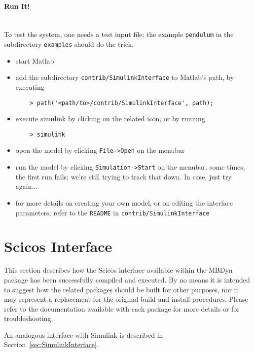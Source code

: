 \documentclass[10pt,dvips]{report}
\newcommand{\kw}[1]{\texttt{#1}}
\begin{document}
\paragraph{Run It!} \mbox{} \\
To test the system, one needs a test input file; the example
\kw{pendulum} in the subdirectory \kw{examples}
should do the trick.
\begin{itemize}
\item start Matlab
\item add the subdirectory \kw{contrib/SimulinkInterface} to Matlab's
path, by executing
\begin{verbatim}
    > path('<path/to>/contrib/SimulinkInterface', path);
\end{verbatim}
\item execute simulink by clicking on the related icon, or by running
\begin{verbatim}
    > simulink
\end{verbatim}
\item open the model by clicking \kw{File->Open} on the menubar
\item run the model by clicking \kw{Simulation->Start} on the menubar.
some times, the first run fails; we're still trying to track that down.
In case, just try again...
\item for more details on creating your own model, or on editing
the interface parameters, refer to the \kw{README}
in \kw{contrib/SimulinkInterface}
\end{itemize}

\section{Scicos Interface}
\label{sec:ScicosInterface}
This section describes how the Scicos \cite{SCICOS} interface available
within the MBDyn package has been successfully compiled and executed.
By no means it is intended to suggest how the related packages
should be built for other purposes, nor it may represent a replacement
for the original build and install procedures.
Please refer to the documentation available with each package
for more details or for troubleshooting.

An analogous interface with Simulink \cite{SIMULINK}
is described in Section~\ref{sec:SimulinkInterface}.
\end{document}
